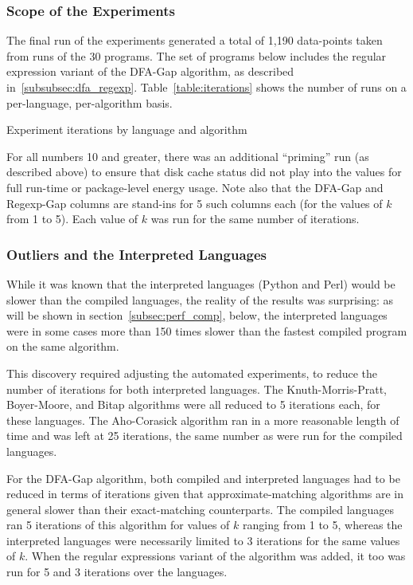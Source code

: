 \subsubsection{Scope of the Experiments}

The final run of the experiments generated a total of 1,190 data-points taken from runs of the 30 programs. The set of programs below includes the regular expression variant of the DFA-Gap algorithm, as described in~\ref{subsubsec:dfa_regexp}. Table~\ref{table:iterations} shows the number of runs on a per-language, per-algorithm basis.

\begin{table}[h!]
\begin{center}

\caption{Experiment iterations by language and algorithm}
\label{table:iterations}
\end{center}
\end{table}

For all numbers 10 and greater, there was an additional ``priming'' run (as described above) to ensure that disk cache status did not play into the values for full run-time or package-level energy usage. Note also that the DFA-Gap and Regexp-Gap columns are stand-ins for 5 such columns each (for the values of $k$ from 1 to 5). Each value of $k$ was run for the same number of iterations.

\subsubsection{Outliers and the Interpreted Languages}

While it was known that the interpreted languages (Python and Perl) would be slower than the compiled languages, the reality of the results was surprising: as will be shown in section~\ref{subsec:perf_comp}, below, the interpreted languages were in some cases more than 150 times slower than the fastest compiled program on the same algorithm.

This discovery required adjusting the automated experiments, to reduce the number of iterations for both interpreted languages. The Knuth-Morris-Pratt, Boyer-Moore, and Bitap algorithms were all reduced to 5 iterations each, for these languages. The Aho-Corasick algorithm ran in a more reasonable length of time and was left at 25 iterations, the same number as were run for the compiled languages.

For the DFA-Gap algorithm, both compiled and interpreted languages had to be reduced in terms of iterations given that approximate-matching algorithms are in general slower than their exact-matching counterparts. The compiled languages ran 5 iterations of this algorithm for values of $k$ ranging from 1 to 5, whereas the interpreted languages were necessarily limited to 3 iterations for the same values of $k$. When the regular expressions variant of the algorithm was added, it too was run for 5 and 3 iterations over the languages.

